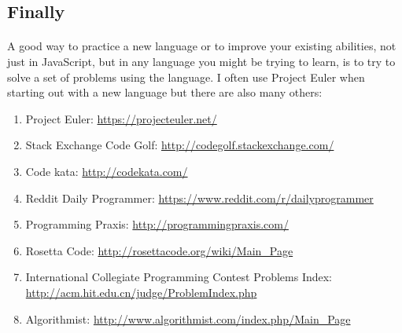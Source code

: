 \documentclass[10pt, a4paper]{article}
\begin{document}

\subsection{Finally}
\paragraph{} A good way to practice a new language or to improve your existing abilities, not just in JavaScript, but in any language you might be trying to learn, is to try to solve a set of problems using the language. I often use Project Euler when starting out with a new language but there are also many others:

\begin{enumerate}
\item Project Euler: \url{https://projecteuler.net/}
\item Stack Exchange Code Golf: \url{http://codegolf.stackexchange.com/}
\item Code kata: \url{http://codekata.com/}
\item Reddit Daily Programmer: \url{https://www.reddit.com/r/dailyprogrammer}
\item Programming Praxis: \url{http://programmingpraxis.com/}
\item Rosetta Code: \url{http://rosettacode.org/wiki/Main_Page}
\item International Collegiate Programming Contest Problems Index: \url{http://acm.hit.edu.cn/judge/ProblemIndex.php}
\item Algorithmist: \url{http://www.algorithmist.com/index.php/Main_Page}
\end{enumerate}
\end{document}
